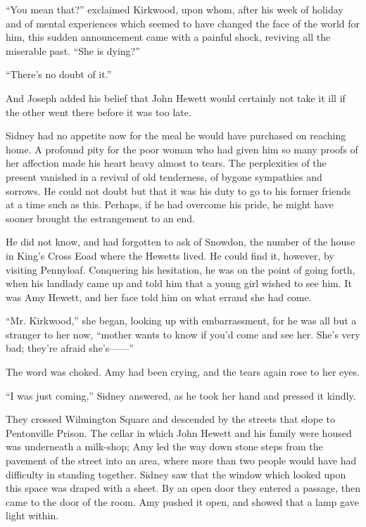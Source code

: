 ``You mean that?'' exclaimed Kirkwood, upon whom, after his week of
holiday and of mental experiences which seemed to have
{\protect\hypertarget{165}{}{}}changed the face of the world for him,
this sudden announcement came with a painful shock, reviving all the
miserable past. ``She is dying?''

``There's no doubt of it.''

And Joseph added his belief that John Hewett would certainly not take it
ill if the other went there before it was too late.

Sidney had no appetite now for the meal he would have purchased on
reaching home. A profound pity for the poor woman who had given him so
many proofs of her affection made his heart heavy almost to tears. The
perplexities of the present vanished in a revival of old tenderness, of
bygone sympathies and sorrows. He could not doubt but that it was his
duty to go to his former friends at a time such as this. Perhaps, if he
had overcome his pride, he might have sooner brought the estrangement to
an end.

He did not know, and had forgotten to ask of Snowdon, the number of the
house in King's Cross Eoad where the Hewetts lived. He could find it,
however, by visiting {\protect\hypertarget{166}{}{}}Pennyloaf.
Conquering his hesitation, he was on the point of going forth, when his
landlady came up and told him that a young girl wished to see him. It
was Amy Hewett, and her face told him on what errand she had come.

``Mr. Kirkwood,'' she began, looking up with embarrassment, for he was
all but a stranger to her now, ``mother wants to know if you'd come and
see her. She's very bad; they're afraid {she's{{------}}''}

The word was choked. Amy had been crying, and the tears again rose to
her eyes.

``I was just coming,'' Sidney answered, as he took her hand and pressed
it kindly.

They crossed Wilmington Square and descended by the streets that slope
to Pentonville Prison. The cellar in which John Hewett and his family
were housed was underneath a milk-shop; Amy led the way down stone steps
from the pavement of the street into an area, where more than two people
would have had difficulty in standing together. Sidney saw that the
window which looked upon this space was draped with a
{\protect\hypertarget{167}{}{}}sheet. By an open door they entered a
passage, then came to the door of the room. Amy pushed it open, and
showed that a lamp gave light within.

